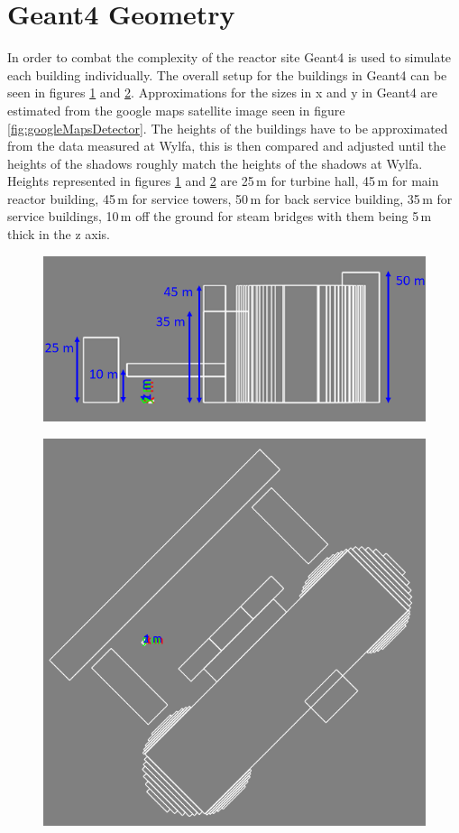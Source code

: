 \documentclass[12pt,a4paper]{article}
\begin{document}
\section{Geant4 Geometry} \label{sec:geant4Geometry}
In order to combat the complexity of the reactor site Geant4 is used to simulate each building individually. The overall setup for the buildings in Geant4 can be seen in figures \ref{fig:WylfaSideOnG4} and \ref{fig:WylfaTopDownG4}. Approximations for the sizes in x and y in Geant4 are estimated from the google maps satellite image seen in figure \ref{fig:googleMapsDetector}. The heights of the buildings have to be approximated from the data measured at Wylfa, this is then compared and adjusted until the heights of the shadows roughly match the heights of the shadows at Wylfa. Heights represented in figures \ref{fig:WylfaSideOnG4} and \ref{fig:WylfaTopDownG4} are 25\,m for turbine hall, 45\,m for main reactor building, 45\,m for service towers, 50\,m for back service building, 35\,m for service buildings, 10\,m off the ground for steam bridges with them being 5\,m thick in the z axis. 

\begin{figure}[H]
 \centering
 \includegraphics[width=0.6\linewidth]{wylfaReactorBuildings/WylfaG4GeometryHeight.png}
  \label{fig:WylfaSideOnG4}
\end{figure}

\begin{figure}[H]
 \centering
 \includegraphics[width=0.5\linewidth]{wylfaReactorBuildings/WylfaTopDownGeomRedoCut.png}
  \label{fig:WylfaTopDownG4}
\end{figure}
\end{document}
